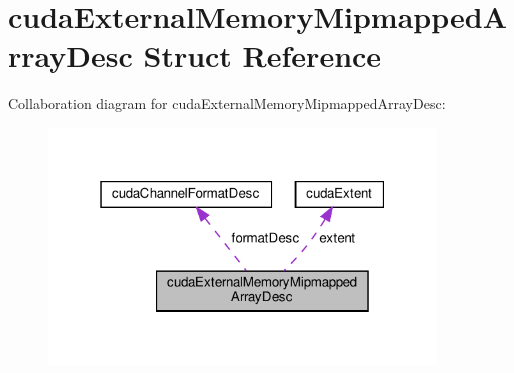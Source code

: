 \hypertarget{structcudaExternalMemoryMipmappedArrayDesc}{}\section{cuda\+External\+Memory\+Mipmapped\+Array\+Desc Struct Reference}
\label{structcudaExternalMemoryMipmappedArrayDesc}


Collaboration diagram for cuda\+External\+Memory\+Mipmapped\+Array\+Desc\+:\nopagebreak
\begin{figure}[H]
\begin{center}
\leavevmode
\includegraphics[width=292pt]{structcudaExternalMemoryMipmappedArrayDesc__coll__graph}
\end{center}
\end{figure}
